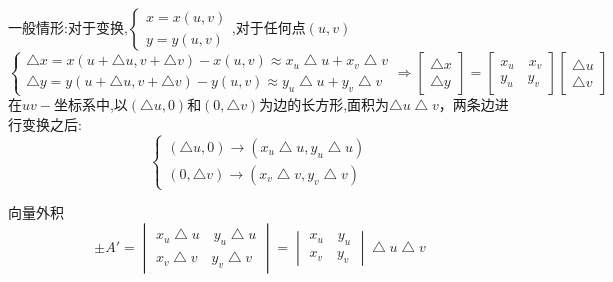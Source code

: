 \documentclass{ctexart}
\begin{document}
   \begin{tcolorbox}[title = {关于变量替换dxdy=Jdudv},colbacktitle=green!35!black,colback=green!1,arc = 2mm, outer arc = 2mm,fonttitle = \itshape, fontupper = \itshape, fontlower = \itshape]
   	一般情形:对于变换,$
   	\left\{\begin{matrix}
   	   	x=x(u,v) \\
   		y=y(u,v)
   	\end{matrix}\right.
   $,对于任何点$(u,v)$  
   $$
   \left\{\begin{matrix}
   	\bigtriangleup x=x(u+\bigtriangleup u,v+\bigtriangleup v)-x(u,v)\approx x_{u}\bigtriangleup u+ x_{v}\bigtriangleup v \\
   	\bigtriangleup y=y(u+\bigtriangleup u,v+\bigtriangleup v)-y(u,v)\approx y_{u}\bigtriangleup u+ y_{v}\bigtriangleup v
   \end{matrix}\right. \Rightarrow  
\begin{bmatrix}  
   \bigtriangleup x\\
   \bigtriangleup y     
\end{bmatrix} 
    =\begin{bmatrix}  
    	x_{u} \quad  x_{v}\\
        y_{u} \quad  y_{v}   
    \end{bmatrix}
\begin{bmatrix}  
	\bigtriangleup u\\
	\bigtriangleup v     
\end{bmatrix}  
   $$
     在$uv-$坐标系中,以$\left(\bigtriangleup u,0\right)$和$\left(0,\bigtriangleup v\right)$为边的长方形,面积为$\bigtriangleup u \bigtriangleup v$，两条边进行变换之后:
   $$
   \left\{\begin{matrix}
   	\left(\bigtriangleup u,0 \right) \rightarrow \left(x_{u}\bigtriangleup u,y_{u}\bigtriangleup u \right) \\
   	\left(0,\bigtriangleup v \right) \rightarrow \left(x_{v}\bigtriangleup v,y_{v}\bigtriangleup v \right)
   \end{matrix}\right.
   $$
   
   向量外积$$\pm A'=
   \begin{vmatrix}
   	x_{u}\bigtriangleup u \quad y_{u}\bigtriangleup u\\
   	x_{v}\bigtriangleup v \quad y_{v}\bigtriangleup v
   \end{vmatrix} = \begin{vmatrix}
   x_{u} \quad y_{u}\\
   x_{v} \quad y_{v}
\end{vmatrix}\bigtriangleup u \bigtriangleup v
   $$
   

\end{tcolorbox}
\end{document}
